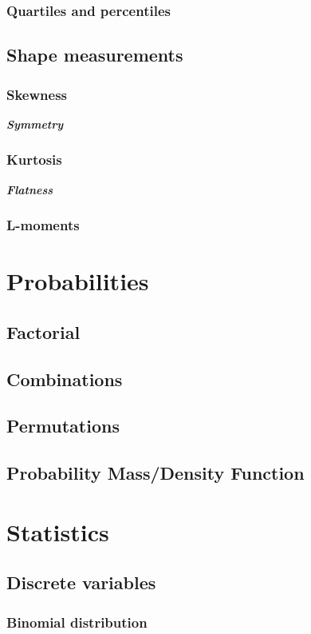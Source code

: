 \documentclass{report}
\newcommand{\notefor}[1]{\hfill\textbf{\textit{#1}}}
\begin{document}
		\subsection{Quartiles and percentiles}
		
	\section{Shape measurements}
		\subsection{Skewness}
		\notefor{Symmetry}
		
		\subsection{Kurtosis}
		\notefor{Flatness}
		
		\subsection{L-moments}

\chapter{Probabilities}
	\section{Factorial}
	\section{Combinations}
	\section{Permutations}
	\section{Probability Mass/Density Function}

\chapter{Statistics}
	\section{Discrete variables}
		\subsection{Binomial distribution}
\end{document}
